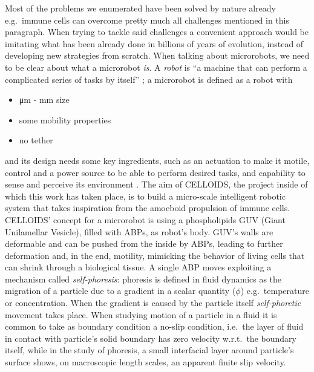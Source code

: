 \documentclass[../../master_thesis_np.tex]{subfiles}
\begin{document}
	Most of the problems we enumerated have been solved by nature already e.g.\ immune cells can overcome pretty much all challenges mentioned in this paragraph. 
	When trying to tackle said challenges a convenient approach would be imitating what has been already done in billions of years of evolution, instead of developing new strategies from scratch. 
	When talking about microrobots, we need to be clear about what a microrobot \emph{is}. 
	A \emph{robot} is \enquote{a machine that can perform a complicated series of tasks by itself} \cite{robot_def_oxf}; a microrobot is defined as a robot with
	\begin{itemize}
	\item \unit{\um} - \unit{\mm} size
	\item some mobility properties
	\item no tether
	\end{itemize}
	and its design needs some key ingredients, such as an actuation to make it motile, control and a power source to be able to perform desired tasks, and capability to sense and perceive its environment \cite{palagi_bioinspired_2018}. 
	The aim of CELLOIDS, the project inside of which this work has taken place, is to build a micro-scale intelligent robotic system that takes inspiration from the amoeboid propulsion of immune cells. 
	CELLOIDS’ concept for a microrobot is using a phospholipids GUV (Giant Unilamellar Vesicle), filled with ABPs, as robot's body. 
	GUV’s walls are deformable and can be pushed from the inside by ABPs, leading to further deformation and, in the end, motility, mimicking the behavior of living cells that can shrink through a biological tissue.
	A single ABP moves exploiting a mechanism called \emph{self-phoresis}: phoresis is defined in fluid dynamics as the migration of a particle due to a gradient in a scalar quantity ($\phi$) e.g.\ temperature or concentration. 
	When the gradient is caused by the particle itself \emph{self-phoretic} movement takes place. 
	When studying motion of a particle in a fluid it is common to take as boundary condition a no-slip condition, i.e.\ the layer of fluid in contact with particle's solid boundary has zero velocity w.r.t.\ the boundary itself, while in the study of phoresis, a small interfacial layer around particle's surface shows, on macroscopic length scales, an apparent finite slip velocity. 
\end{document}
